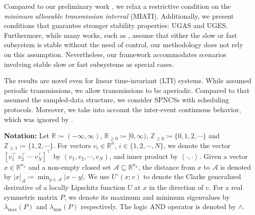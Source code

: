 Compared to our preliminary work \cite{Single_channel_NCS_CDC}, we relax a restrictive condition on the \emph{minimum allowable transmission interval} (MIATI). Additionally, we present conditions that guarantee stronger stability properties: UGAS and UGES. Furthermore, while many works, such as \cite{Romain_ETC}, assume that either the slow or fast subsystem is stable without the need of control, 
our methodology does not rely on this assumption. 
Nevertheless, our framework accommodates scenarios involving stable slow or fast subsystems as special cases.

The results are novel even for linear time-invariant (LTI) systems. While \cite{wang2021observer,song2019dynamic,lei2022event} assumed periodic transmissions, we allow transmissions to be aperiodic. Compared to \cite{song2019dynamic,lei2022event} that assumed the sampled-data structure, we consider SPNCSs with scheduling protocols. Moreover, we take into account the inter-event continuous behavior, which was ignored by \cite{wang2021observer,song2019dynamic}. 
%

















\textbf{Notation:} 
Let $\mathbb{R}\coloneqq (-\infty, \infty)$, $\mathbb{R}_{\geq 0} \coloneqq [0,\infty)$, $\mathbb{Z}_{\geq 0} \coloneqq \{0, 1, 2, \cdots \}$ and $\mathbb{Z}_{\geq 1} \coloneqq \{1, 2, \cdots \}$.
For vectors $v_i\in \mathbb{R}^n$, $i\in \{1,2,\cdots, N\}$, we denote the vector $[v_1^\top \; v_2^\top \; \cdots \; v_N^\top]^\top$ by $(v_1, v_2, \cdots, v_N)$, and inner product by $\left< \cdot , \cdot \right>$. 
%
Given a vector $x\in \mathbb{R}^{n_x}$ and a non-empty closed set $\mathcal{A} \subseteq \mathbb{R}^{n_x}$, the distance from $x$ to $\mathcal{A}$ is denoted by $|x|_\mathcal{A} \coloneqq \min_{y\in \mathcal{A}}|x-y|$.
We use $U^\circ(x;v)$ to denote the Clarke generalized derivative \cite[Eqn. (20)]{teel2000assigning} of a locally Lipschitz function $U$ at $x$ in the direction of $v$. 
%
For a real symmetric matrix $P$, we denote its maximum and minimum eigenvalues by $\lambda_{\text{max}}(P)$ and $\lambda_{\text{min}}(P)$ respectively. The logic AND operator is denoted by $\wedge$.




